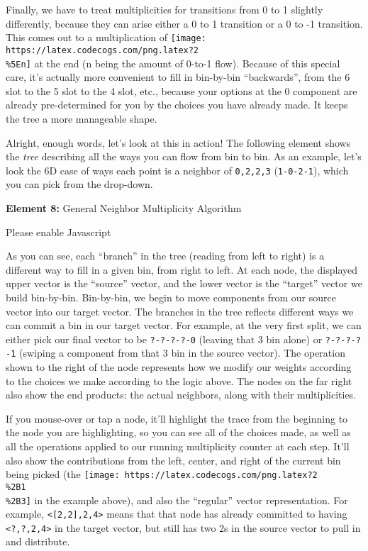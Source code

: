 \documentclass[]{article}
\begin{document}
Finally, we have to treat multiplicities for transitions from 0 to 1 slightly
differently, because they can arise either a 0 to 1 transition or a 0 to -1
transition. This comes out to a multiplication of
\texttt{[image: https://latex.codecogs.com/png.latex?2\\\%5En]} at the end (n
being the amount of 0-to-1 flow). Because of this special care, it's actually
more convenient to fill in bin-by-bin ``backwards'', from the 6 slot to the 5
slot to the 4 slot, etc., because your options at the 0 component are already
pre-determined for you by the choices you have already made. It keeps the tree a
more manageable shape.

Alright, enough words, let's look at this in action! The following element shows
the \emph{tree} describing all the ways you can flow from bin to bin. As an
example, let's look the 6D case of ways each point is a neighbor of
\texttt{0,2,2,3} (\texttt{1-0-2-1}), which you can pick from the drop-down.

\leavevmode\hypertarget{golTree}{}%
\textbf{Element 8:} General Neighbor Multiplicity Algorithm

\leavevmode\hypertarget{golTreeCont}{}%
Please enable Javascript

As you can see, each ``branch'' in the tree (reading from left to right) is a
different way to fill in a given bin, from right to left. At each node, the
displayed upper vector is the ``source'' vector, and the lower vector is the
``target'' vector we build bin-by-bin. Bin-by-bin, we begin to move components
from our source vector into our target vector. The branches in the tree reflects
different ways we can commit a bin in our target vector. For example, at the
very first split, we can either pick our final vector to be \texttt{?-?-?-?-0}
(leaving that 3 bin alone) or \texttt{?-?-?-?-1} (swiping a component from that
3 bin in the source vector). The operation shown to the right of the node
represents how we modify our weights according to the choices we make according
to the logic above. The nodes on the far right also show the end products: the
actual neighbors, along with their multiplicities.

If you mouse-over or tap a node, it'll highlight the trace from the beginning to
the node you are highlighting, so you can see all of the choices made, as well
as all the operations applied to our running multiplicity counter at each step.
It'll also show the contributions from the left, center, and right of the
current bin being picked (the
\texttt{[image: https://latex.codecogs.com/png.latex?2\\\%2B1\\\%2B3]} in the
example above), and also the ``regular'' vector representation. For example,
\texttt{\textless{}{[}2,2{]},2,4\textgreater{}} means that that node has already
committed to having \texttt{\textless{}?,?,2,4\textgreater{}} in the target
vector, but still has two 2s in the source vector to pull in and distribute.
\end{document}
